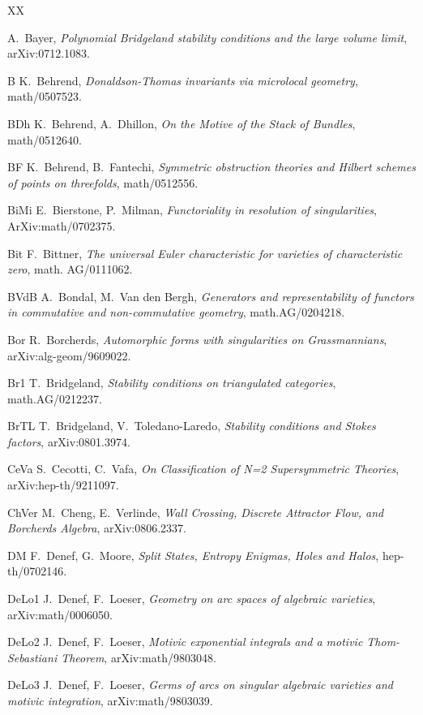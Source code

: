 \documentclass[12pt]{article}
\begin{document}
\begin{thebibliography}{XX}

 A.~Bayer, {\it Polynomial Bridgeland stability conditions and the large volume limit}, arXiv:0712.1083.


\bibitem
{B} K.~Behrend, {\it  Donaldson-Thomas invariants via microlocal geometry}, math/0507523.

\bibitem
{BDh} K.~Behrend, A.~Dhillon, {\it On the Motive of the Stack of Bundles}, math/0512640.

\bibitem
{BF} K.~Behrend, B.~Fantechi, {\it  Symmetric obstruction theories and Hilbert schemes of points on threefolds},
math/0512556.

\bibitem
{BiMi} E.~Bierstone, P.~Milman, {\it  Functoriality in resolution of singularities}, ArXiv:math/0702375.


\bibitem
{Bit} F.~Bittner, {\it The universal Euler characteristic for varieties of characteristic zero}, math. AG/0111062.


\bibitem
 {BVdB} A.~Bondal, M.~Van den Bergh, {\it Generators and representability of functors in commutative and non-commutative geometry}, math.AG/0204218.


\bibitem
 {Bor} R.~Borcherds, {\it Automorphic forms with singularities on Grassmannians}, arXiv:alg-geom/9609022.


\bibitem
{Br1} T.~Bridgeland, {\it Stability conditions on triangulated categories}, math.AG/0212237.


\bibitem
{BrTL} T.~Bridgeland, V.~Toledano-Laredo, {\it Stability conditions and Stokes factors}, arXiv:0801.3974.


\bibitem
 {CeVa} S.~Cecotti, C.~Vafa, {\it On Classification of N=2 Supersymmetric Theories},  arXiv:hep-th/9211097.


\bibitem
 {ChVer} M.~Cheng, E.~Verlinde, {\it  Wall Crossing, Discrete Attractor Flow, and Borcherds Algebra},
arXiv:0806.2337.

\bibitem
 {DM} F.~Denef, G.~Moore, {\it Split States, Entropy Enigmas, Holes and Halos},
hep-th/0702146.


\bibitem
 {DeLo1} J.~Denef, F.~Loeser, {\it Geometry on arc spaces of algebraic varieties},
arXiv:math/0006050.


\bibitem
 {DeLo2} J.~Denef, F.~Loeser, {\it Motivic exponential integrals and a motivic Thom-Sebastiani Theorem},
arXiv:math/9803048.


\bibitem
 {DeLo3} J.~Denef, F.~Loeser, {\it Germs of arcs on singular algebraic varieties and motivic integration},
arXiv:math/9803039.




\end{thebibliography}
\end{document}
